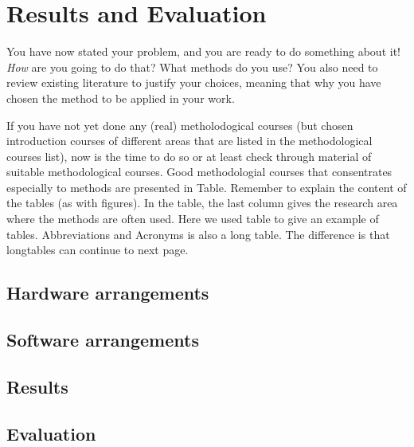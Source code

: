 
\chapter{Results and Evaluation}
\label{chapter:Results and Evaluation}

You have now stated your problem, and you are ready to do something
about it!  \emph{How} are you going to do that? What methods do you
use?  You also need to review existing literature to justify your
choices, meaning that why you have chosen the method to be applied in
your work.

If you have not yet done any (real) metholodogical courses (but chosen introduction courses of different areas that are listed in the
methodological courses list), now is the time to do so or at least
check through material of suitable methodological courses. Good
methodologial courses that consentrates especially to methods are
presented in Table. Remember to explain the
content of the tables (as with figures). In the table, the last column gives the research area where the methods are often used. Here we used table to give an example of tables. Abbreviations and Acronyms is also a long table. The difference is that longtables can continue to next page.

\section{Hardware arrangements}
\label{section:Hardware arrangements}

\section{Software arrangements}
\label{section:Software arrangements}

\section{Results}
\label{section:Results}

\section{Evaluation}
\label{section:Evaluation}